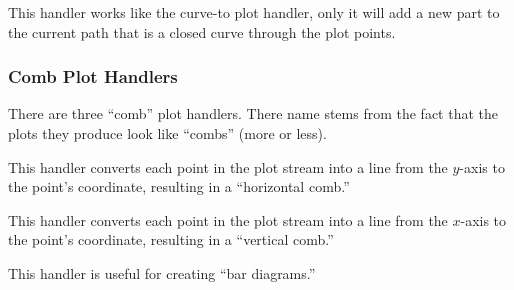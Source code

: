 \begin{command}{\pgfplothandlerclosedcurve}
  This handler works like the curve-to plot handler, only it will
  add a new part to the current path that is a closed curve through
  the plot points.
\begin{codeexample}[]
\end{codeexample}
\end{command}


\subsubsection{Comb Plot Handlers}

There are three ``comb'' plot handlers. There name stems from the fact
that the plots they produce look like ``combs'' (more or less).

\begin{command}{\pgfplothandlerxcomb}
  This handler converts each point in the plot stream into a line from
  the $y$-axis to the point's coordinate, resulting in a ``horizontal
  comb.''

  
\begin{codeexample}[]
\end{codeexample}
\end{command}


\begin{command}{\pgfplothandlerycomb}
  This handler converts each point in the plot stream into a line from
  the $x$-axis to the point's coordinate, resulting in a ``vertical
  comb.''
  
  This handler is useful for creating ``bar diagrams.''
\begin{codeexample}[]
\end{codeexample}
\end{command}

